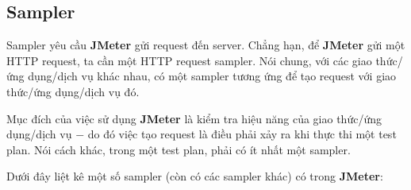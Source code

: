 \documentclass[12pt]{report}
\newcommand{\jmeter}{\textbf{JMeter}}
\begin{document}
\subsection{Sampler}

\par Sampler yêu cầu \jmeter{} gửi request đến server. Chẳng hạn, để \jmeter{} gửi một HTTP request, ta cần một HTTP request sampler. Nói chung, với các giao thức/ứng dụng/dịch vụ khác nhau, có một sampler tương ứng để tạo request với giao thức/ứng dụng/dịch vụ đó.

\par Mục đích của việc sử dụng \jmeter{} là kiểm tra hiệu năng của giao thức/ứng dụng/dịch vụ $-$ do đó việc tạo request là điều phải xảy ra khi thực thi một test plan. Nói cách khác, trong một test plan, phải có ít nhất một sampler.

\par Dưới đây liệt kê một số sampler (còn có các sampler khác) có trong \jmeter{}:
\end{document}
